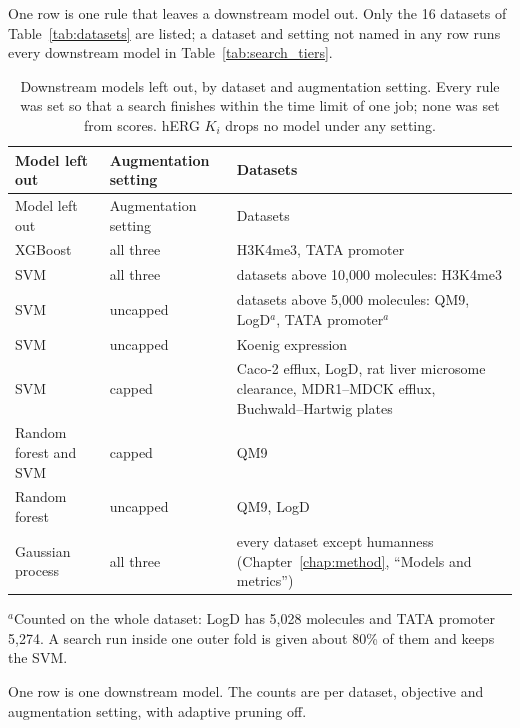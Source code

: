 \label{app:add:models_left_out}
One row is one rule that leaves a downstream model out. Only the 16 datasets of Table~\ref{tab:datasets} are listed; a dataset and setting not named in any row runs every downstream model in Table~\ref{tab:search_tiers}.

{\small
\begin{longtable}{@{}p{2.4cm}p{3.0cm}p{8.6cm}@{}}
\caption{Downstream models left out, by dataset and augmentation setting. Every rule was set so that a search finishes within the time limit of one job; none was set from scores. hERG $K_i$ drops no model under any setting.}
\label{tab:add:models_left_out}\\
\toprule
Model left out & Augmentation setting & Datasets \\
\midrule
\endfirsthead
\toprule
Model left out & Augmentation setting & Datasets \\
\midrule
\endhead
XGBoost & all three & H3K4me3, TATA promoter \\
SVM & all three & datasets above 10{,}000 molecules: H3K4me3 \\
SVM & uncapped & datasets above 5{,}000 molecules: QM9, LogD$^{a}$, TATA promoter$^{a}$ \\
SVM & uncapped & Koenig expression \\
SVM & capped & Caco-2 efflux, LogD, rat liver microsome clearance, MDR1--MDCK efflux, Buchwald--Hartwig plates \\
Random forest and SVM & capped & QM9 \\
Random forest & uncapped & QM9, LogD \\
Gaussian process & all three & every dataset except humanness (Chapter~\ref{chap:method}, ``Models and metrics'') \\
\bottomrule
\end{longtable}
{\footnotesize $^{a}$Counted on the whole dataset: LogD has 5{,}028 molecules and TATA promoter 5{,}274. A search run inside one outer fold is given about 80\% of them and keeps the SVM.}
}

\label{app:add:search_size}
One row is one downstream model. The counts are per dataset, objective and augmentation setting, with adaptive pruning off.

